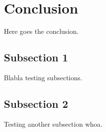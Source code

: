 \section{Conclusion}

Here goes the conclusion.
\subsection{Subsection 1}
Blabla testing subsections.
\subsection{Subsection 2}
Testing another subsection whoa.
